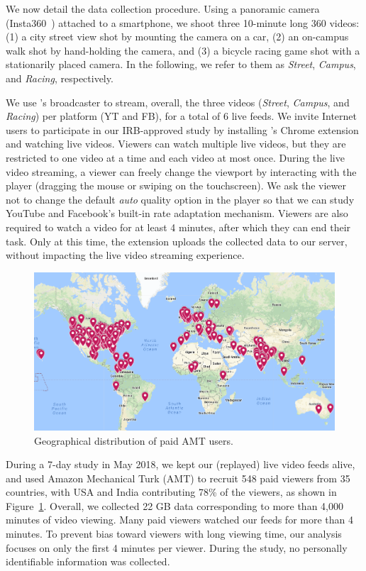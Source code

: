 We now detail the data collection procedure. Using a panoramic camera (Insta360~\cite{insta360}) attached to a smartphone, we shoot three 10-minute long 360\degree{} videos: (1) a city street view shot by mounting the camera on a car, (2) an on-campus walk shot by hand-holding the camera, and (3) a bicycle racing game shot with a stationarily placed camera. In the following, we refer to them as \emph{Street}, \emph{Campus}, and \emph{Racing}, respectively.

We use \lime's broadcaster to stream, overall, the three videos (\emph{Street}, \emph{Campus}, and \emph{Racing}) per platform (YT and FB), for a total of 6 live feeds.
%
We invite Internet users to participate in our IRB-approved study by installing \lime's Chrome extension and watching live videos.
Viewers can watch multiple live videos, but they are restricted to one video at a time and each video at most once. During the live video streaming, a viewer can freely change the viewport by interacting with the player (\eg dragging the mouse or swiping on the touchscreen).
We ask the viewer not to change the default \emph{auto} quality option in the player so that we can study YouTube and Facebook's built-in rate adaptation mechanism. Viewers are also required to watch a video for at least 4 minutes, after which they can end their task. Only at this time, the extension uploads the collected data to our server, without impacting the live video streaming experience.


\begin{figure}[t]
	\centering
	\includegraphics[width=.5\textwidth]{figs/lime/map4.png}
	\caption{Geographical distribution of paid AMT users.}
	\label{fig:map}
\end{figure}


During a 7-day study in May 2018, we kept our (replayed) live video feeds alive, and used Amazon Mechanical Turk (AMT) to recruit 548 paid viewers from 35 countries, with USA and India contributing 78\% of the viewers, as shown in Figure~\ref{fig:map}. Overall, we collected 22 GB data corresponding to more than 4,000 minutes of video viewing. Many paid viewers watched our feeds for more than 4 minutes.  To prevent bias toward viewers with long viewing time, our analysis focuses on only the first 4 minutes per viewer.
During the study, no personally identifiable information was collected.


